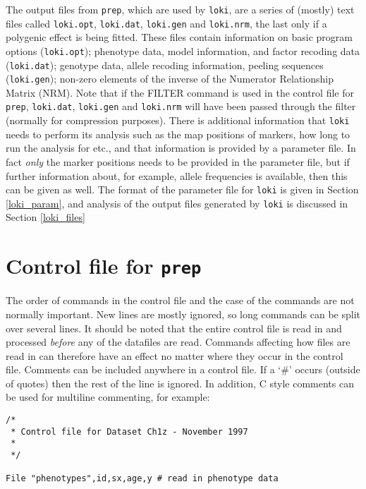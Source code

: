 \documentclass[10pt,a4paper]{article}
\newcommand{\Prep}{\texttt{prep}\xspace}
\newcommand{\Loki}{\texttt{loki}\xspace}
\begin{document}
The output files from \Prep, which are used by \Loki, are a series of
(mostly) text files called \verb+loki.opt+, \verb+loki.dat+, \verb+loki.gen+
and \verb+loki.nrm+, the last only if a polygenic effect is being fitted.
These files contain information on basic program options (\verb+loki.opt+);
phenotype data, model information, and factor recoding data
(\verb+loki.dat+); genotype data, allele recoding information, peeling
sequences (\verb+loki.gen+); non-zero elements of the inverse of the
Numerator Relationship Matrix (NRM). Note that if the FILTER command is used
in the control file for \Prep, \verb+loki.dat+, \verb+loki.gen+ and
\verb+loki.nrm+ will have been passed through the filter (normally for
compression purposes). There is additional information that \Loki needs to
perform its analysis such as the map positions of markers, how long to run
the analysis for etc., and that information is provided by a parameter file.
In fact \emph{only} the marker positions needs to be provided in the
parameter file, but if further information about, for example, allele
frequencies is available, then this can be given as well.  The format of
the parameter file for \Loki is given in Section \ref{loki_param}, and
analysis of the output files generated by \Loki is discussed in Section
\ref{loki_files}

\section{Control file for \Prep}
\label{prep_control}
The order of commands in the control file and the case of the commands are
not normally important.  New lines are mostly ignored, so long commands can
be split over several lines.  It should be noted that the entire control file is
read in and processed \emph{before} any of the datafiles are read.  Commands
affecting how files are read in can therefore have an effect no matter where
they occur in the control file. Comments can be included anywhere in a
control file.  If a `\#' occurs (outside of quotes) then the rest of the line
is ignored.  In addition, C style comments can be used for multiline
commenting, for example:
\begin{verbatim}
/* 
 * Control file for Dataset Ch1z - November 1997
 *
 */

File "phenotypes",id,sx,age,y # read in phenotype data
\end{verbatim}
\end{document}
